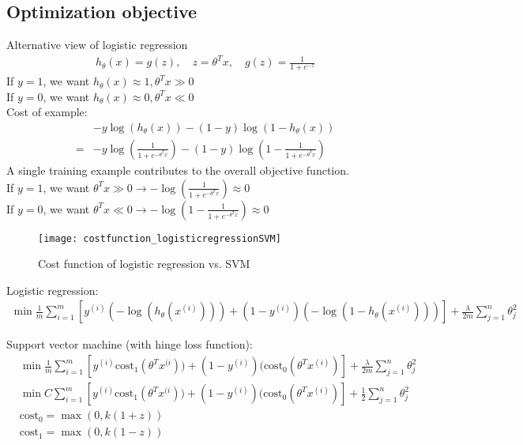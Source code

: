 \subsection{Optimization objective}
Alternative view of logistic regression\\
\begin{align*} 
h_\theta(x) = g(z), \quad z = \theta^Tx, \quad  g(z) = \frac{1}{1+e^{-z}}
\end{align*}
If $y = 1$, we want $h_\theta(x) \approx 1, \theta^Tx \gg 0$\\
If $y = 0$, we want $h_\theta(x) \approx 0, \theta^Tx \ll 0$\\
Cost of example:\\
\begin{align*} 
  &-y \log(h_\theta(x)) - (1-y) \log(1- h_\theta(x))\\
=&-y \log(\frac{1}{1+e^{-\theta^Tx}}) - (1-y) \log(1- \frac{1}{1+e^{-\theta^Tx}})
\end{align*}
A single training example contributes to the overall objective function.\\
If $y = 1$, we want $\theta^Tx \gg 0 \rightarrow -\log(\frac{1}{1+e^{-\theta^Tx}}) \approx 0$\\
If $y = 0$, we want $\theta^Tx \ll 0 \rightarrow -\log(1- \frac{1}{1+e^{-\theta^Tx}}) \approx 0$\\

\begin{figure}[h]
\centering
\texttt{[image: costfunction\_logisticregressionSVM]}
\caption{Cost function of logistic regression vs. SVM}
\label{fig:costfunction_logisticregressionSVM}
\end{figure}

Logistic regression:\\
   \begin{align*} 
        \min\frac{1}{m}\sum_{i=1}^m \left[ y^{(i)}(-\log(h_\theta(x^{(i)}))) + (1-y^{(i)})(-\log(1- h_\theta(x^{(i)}))) \right] + \frac{\lambda}{2m}\sum_{j=1}^n\theta_j^2
    \end{align*}
    
Support vector machine (with hinge loss function):\\
   \begin{align} 
        &\min\frac{1}{m}\sum_{i=1}^m \left[ y^{(i)}\text{cost}_1(\theta^Tx^{(i})) + (1-y^{(i)})(\text{cost}_0(\theta^Tx^{(i)}) \right] + \frac{\lambda}{2m}\sum_{j=1}^n\theta_j^2\\
        &\min C \sum_{i=1}^m \left[ y^{(i)}\text{cost}_1(\theta^Tx^{(i})) + (1-y^{(i)})(\text{cost}_0(\theta^Tx^{(i)}) \right] + \frac{1}{2}\sum_{j=1}^n\theta_j^2\\
    &\text{cost}_0 = \max(0, k(1+z)) \nonumber\\
    &\text{cost}_1 = \max(0, k(1-z)) \nonumber         
    \end{align}

